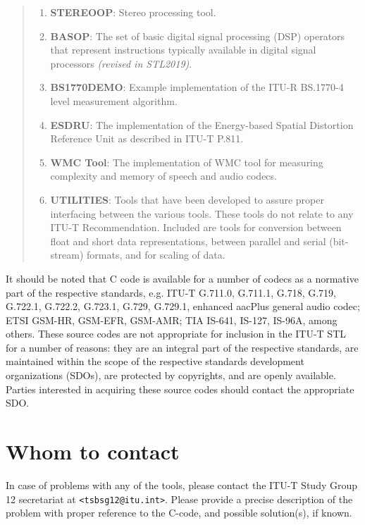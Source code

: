 \begin{quote}
\begin{enumerate}
\item {\bf STEREOOP}: Stereo processing tool.

\item {\bf BASOP}: The set of basic digital signal processing (DSP) operators that represent instructions typically available in digital signal processors \emph{(revised in STL2019)}.

\item {\bf BS1770DEMO}: Example implementation of the ITU-R BS.1770-4 level measurement algorithm.

\item {\bf ESDRU}: The implementation of the Energy-based Spatial Distortion Reference Unit as described in ITU-T P.811.

\item {\bf WMC Tool}: The implementation of WMC tool for measuring complexity and memory of speech and audio codecs.

\item {\bf UTILITIES}: Tools that have been developed to assure proper interfacing between the various tools.
These tools do not relate to any ITU-T Recommendation.
Included are tools for conversion between float and short data representations, between parallel and serial (bit-stream) formats, and for scaling of data.

\end{enumerate}
\end{quote}

It should be noted that C code is available for a number of codecs as
a normative part of the respective standards, e.g. ITU-T G.711.0,
G.711.1, G.718, G.719, G.722.1, G.722.2, G.723.1, G.729, G.729.1,
enhanced aacPlus general audio codec; ETSI GSM-HR, GSM-EFR, GSM-AMR;
TIA IS-641, IS-127, IS-96A, among others. These source codes are not
appropriate for inclusion in the ITU-T STL for a number of reasons:
they are an integral part of the respective standards, are maintained
within the scope of the respective standards development organizations
(SDOs), are protected by copyrights, and are openly available. Parties
interested in acquiring these source codes should contact the
appropriate SDO.

\section{Whom to contact}

In case of problems with any of the tools, please contact the ITU-T Study Group 12 secretariat at {\tt <tsbsg12@itu.int>}.
Please provide a precise description of the problem with proper reference to the C-code, and possible solution(s), if known.

